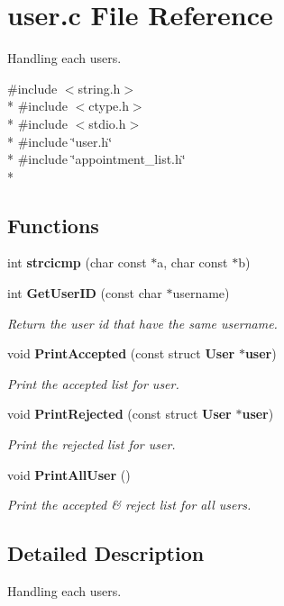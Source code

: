 \section{user.\+c File Reference}
\label{user_8c}


Handling each users.  


{\ttfamily \#include $<$string.\+h$>$}\\*
{\ttfamily \#include $<$ctype.\+h$>$}\\*
{\ttfamily \#include $<$stdio.\+h$>$}\\*
{\ttfamily \#include \char`\"{}user.\+h\char`\"{}}\\*
{\ttfamily \#include \char`\"{}appointment\+\_\+list.\+h\char`\"{}}\\*
\subsection*{Functions}
\begin{DoxyCompactItemize}
\item 
int {\bf strcicmp} (char const $\ast$a, char const $\ast$b)
\item 
int {\bf Get\+User\+I\+D} (const char $\ast$username)
\begin{DoxyCompactList}\small\item\em Return the user id that have the same username. \end{DoxyCompactList}\item 
void {\bf Print\+Accepted} (const struct {\bf User} $\ast${\bf user})
\begin{DoxyCompactList}\small\item\em Print the accepted list for user. \end{DoxyCompactList}\item 
void {\bf Print\+Rejected} (const struct {\bf User} $\ast${\bf user})
\begin{DoxyCompactList}\small\item\em Print the rejected list for user. \end{DoxyCompactList}\item 
void {\bf Print\+All\+User} ()
\begin{DoxyCompactList}\small\item\em Print the accepted \& reject list for all users. \end{DoxyCompactList}\end{DoxyCompactItemize}


\subsection{Detailed Description}
Handling each users. 

